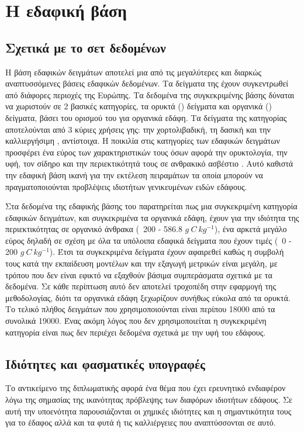 \chapter{Η εδαφική βάση  }

\section{Σχετικά με το σετ δεδομένων}
Η βάση εδαφικών δειγμάτων  αποτελεί μια από τις μεγαλύτερες και διαρκώς αναπτυσσόμενες βάσεις εδαφικών δεδομένων. Τα δείγματα της έχουν συγκεντρωθεί από διάφορες περιοχές της Ευρώπης. 
Τα δεδομένα της συγκεκριμένης βάσης δύναται να χωριστούν σε 2 βασικές κατηγορίες, τα ορυκτά () δείγματα και οργανικά () δείγματα, βάσει του ορισμού του  για οργανικά εδάφη. Τα δείγματα της κατηγορίας  αποτελούνται από 3 κύριες χρήσεις γης: την χορτολιβαδική, τη δασική και την καλλιεργήσιμη , αντίστοιχα. Η ποικιλία στις κατηγορίες των εδαφικών δειγμάτων προσφέρει ένα εύρος των χαρακτηριστικών τους όσων αφορά την ορυκτολογία, την υφή, τον σίδηρο και την περιεκτικότητά τους σε ανθρακικό ασβέστιο \cite{nocita_lucas_soil}. Αυτό καθιστά την εδαφική βάση ικανή για την εκτέλεση πειραμάτων τα οποία μπορούν να πραγματοποιούνται προβλέψεις ιδιοτήτων γενικευμένων ειδών εδάφους.

Στα δεδομένα της εδαφικής βάσης του  παρατηρείται πως μια συγκεκριμένη κατηγορία εδαφικών δειγμάτων, και συγκεκριμένα τα οργανικά εδάφη, έχουν για την ιδιότητα της περιεκτικότητας σε οργανικό άνθρακα (~200 - 586.8 $g~C~kg^{-1}$), ένα αρκετά μεγάλο εύρος δηλαδή σε σχέση με όλα τα υπόλοιπα εδαφικά δείγματα που έχουν τιμές (~0 - 200 $g~C~kg^{-1}$). Έτσι τα συγκεκριμένα δείγματα έχουν αφαιρεθεί καθώς η συμβολή τους κατά την εκπαίδευση μοντέλων και την εξαγωγή μετρικών είναι μεγάλη, με τρόπου που δεν είναι εφικτό να εξαχθούν βάσιμα συμπεράσματα σχετικά με τα δεδομένα. Σε κάθε περίπτωση αυτό δεν αποτελεί τροχοπέδη στην εφαρμογή της μεθοδολογίας, διότι τα οργανικά εδάφη ξεχωρίζουν συνήθως εύκολα από τα ορυκτά. Το τελικό πλήθος δειγμάτων που χρησιμοποιούνται είναι περίπου 18000 από τα συνολικά 19000. Ένας ακόμη λόγος που δεν χρησιμοποιείται η συγκεκριμένη κατηγορία είναι πως δεν περιέχει δεδομένα σχετικά με την υφή του εδάφους.

\section{Ιδιότητες και φασματικές υπογραφές}
Το αντικείμενο της διπλωματικής αφορά ένα θέμα που έχει ερευνητικό ενδιαφέρον λόγω της σημασίας της ικανότητας πρόβλεψης των διαφόρων ιδιοτήτων εδάφους. Σε αυτή την υποενότητα παρουσιάζονται οι χημικές ιδιότητες και η σημαντικότητα τους για το έδαφος αλλά και τα φυτά ή τις καλλιέργειες που αναπτύσσονται σε αυτό.

